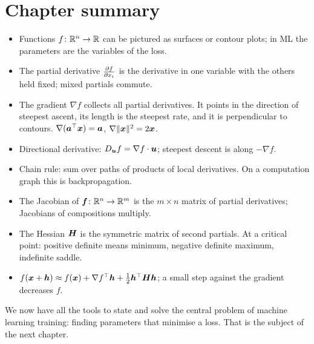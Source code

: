 \section{Chapter summary}\label{sec:ch7-summary}

\begin{keytakeaways}
\begin{itemize}
  \item Functions $f\colon\mathbb{R}^n\to\mathbb{R}$ can be pictured as surfaces or contour
    plots; in ML the parameters are the variables of the loss.
  \item The partial derivative $\frac{\partial f}{\partial x_i}$ is the derivative in one
    variable with the others held fixed; mixed partials commute.
  \item The gradient $\nabla f$ collects all partial derivatives. It points in
    the direction of steepest ascent, its length is the steepest rate, and it is
    perpendicular to contours. $\nabla(\bm{a}^\top\bm{x}) = \bm{a}$,
    $\nabla\lVert\bm{x}\rVert^2 = 2\bm{x}$.
  \item Directional derivative: $D_{\bm{u}}f = \nabla f\cdot\bm{u}$; steepest descent
    is along $-\nabla f$.
  \item Chain rule: sum over paths of products of local derivatives. On a
    computation graph this is backpropagation.
  \item The Jacobian of $\bm{f}\colon\mathbb{R}^n\to\mathbb{R}^m$ is the $m\times n$ matrix of
    partial derivatives; Jacobians of compositions multiply.
  \item The Hessian $\bm{H}$ is the symmetric matrix of second partials. At a
    critical point: positive definite means minimum, negative definite maximum,
    indefinite saddle.
  \item $f(\bm{x} + \bm{h}) \approx f(\bm{x}) + \nabla f^\top\bm{h} + \frac12\bm{h}^\top\bm{H}\bm{h}$;
    a small step against the gradient decreases $f$.
\end{itemize}
\end{keytakeaways}

We now have all the tools to state and solve the central problem of machine
learning training: finding parameters that minimise a loss. That is the subject
of the next chapter.
